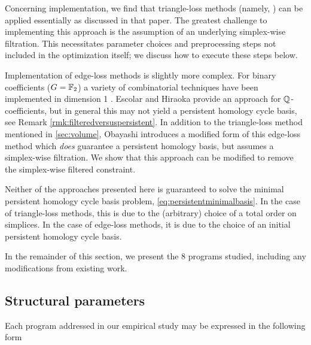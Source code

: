 Concerning implementation, we find that triangle-loss methods (namely, \cite{Obayashi2018}) can be applied essentially as discussed in that paper.  The greatest challenge to implementing this approach is the assumption of an underlying simplex-wise filtration. This necessitates parameter choices and preprocessing steps not included in the optimization itself; we discuss how to execute these steps below.  

Implementation of edge-loss methods is slightly more complex.  For binary coefficients ($G = \mathbb{F}_2$) a variety of combinatorial techniques have been implemented in dimension 1 \cite{chenquantifying, zhang2019heuristic}.  Escolar and Hiraoka \cite{Escolar2016} provide an approach for $\mathbb{Q}$-coefficients, but in general this may not yield a persistent homology cycle basis, see Remark \ref{rmk:filteredversuspersistent}.   
In addition to the triangle-loss method mentioned in \se \ref{sec:volume}, Obayashi \cite{Obayashi2018} introduces a modified form of this edge-loss method which \emph{does} guarantee a persistent homology basis, but assumes a simplex-wise filtration.  We show that this approach can be modified to remove the simplex-wise filtered constraint.

Neither of the approaches presented here is guaranteed to solve the minimal persistent homology cycle basis problem, \eq \eqref{eq:persistentminimalbasis}.  In the case of triangle-loss methods, this is due to the (arbitrary) choice of a total order on simplices.  In the case of edge-loss methods, it is due to the choice of an initial persistent homology cycle basis.  

In the remainder of this section, we present the 8 programs studied, including any modifications from existing work.

\subsection{Structural parameters}
\label{sec_structuralparams}

Each program addressed in our empirical study may be expressed in the following form


